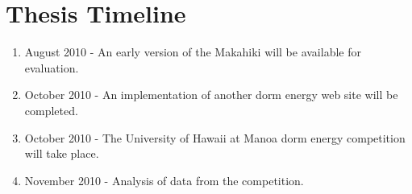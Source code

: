 \section{Thesis Timeline}
\label{timeline}

\begin{enumerate}
\item August 2010 - An early version of the Makahiki will be available for evaluation.
\item October 2010 - An implementation of another dorm energy web site will be completed.
\item October 2010 - The University of Hawaii at Manoa dorm energy competition will take place.
\item November 2010 - Analysis of data from the competition.
\end{enumerate}